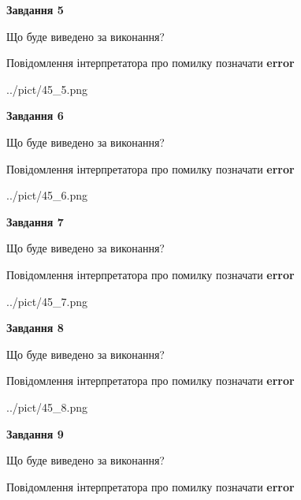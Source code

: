 \documentclass[11pt, ukrainian]{article}
\begin{document}
{\begin {large}
{\begin {center}\textbf{Завдання 5}\end {center}}\par
Що буде виведено за виконання? \par
Повідомлення інтерпретатора про помилку позначати \textbf{error}

\begin{center}
	{../pict/45_5.png}
\end{center}
\newpage

{\begin {center}\textbf{Завдання 6}\end {center}}\par
Що буде виведено за виконання? \par
Повідомлення інтерпретатора про помилку позначати \textbf{error}

\begin{center}
	{../pict/45_6.png}
\end{center}
\newpage

{\begin {center}\textbf{Завдання 7}\end {center}}\par
Що буде виведено за виконання? \par
Повідомлення інтерпретатора про помилку позначати \textbf{error}

\begin{center}
	{../pict/45_7.png}
\end{center}
\newpage

{\begin {center}\textbf{Завдання 8}\end {center}}\par
Що буде виведено за виконання? \par
Повідомлення інтерпретатора про помилку позначати \textbf{error}

\begin{center}
	{../pict/45_8.png}
\end{center}
\newpage

{\begin {center}\textbf{Завдання 9}\end {center}}\par
Що буде виведено за виконання? \par
Повідомлення інтерпретатора про помилку позначати \textbf{error}


\end{large}}
\end{document}
